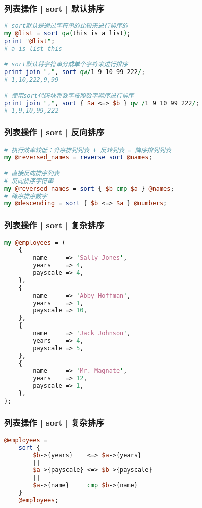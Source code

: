 \begin{frame}[fragile]
  \frametitle{列表操作 | sort | \alert{默认排序}}
\begin{lstlisting}[language=Perl]
# sort默认是通过字符串的比较来进行排序的
my @list = sort qw(this is a list);
print "@list";
# a is list this

# sort默认将字符串分成单个字符来进行排序
print join ",", sort qw/1 9 10 99 222/;
# 1,10,222,9,99

# 使用sort代码块将数字按照数字顺序进行排序
print join ",", sort { $a <=> $b } qw /1 9 10 99 222/;
# 1,9,10,99,222
\end{lstlisting}
\end{frame}

\begin{frame}[fragile]
  \frametitle{列表操作 | sort | \alert{反向排序}}
\begin{lstlisting}[language=Perl]
# 执行效率较低：升序排列列表 + 反转列表 = 降序排列列表
my @reversed_names = reverse sort @names;

# 直接反向排序列表
# 反向排序字符串
my @reversed_names = sort { $b cmp $a } @names;
# 降序排序数字
my @descending = sort { $b <=> $a } @numbers;
\end{lstlisting}
\end{frame}

\begin{frame}[fragile]
  \frametitle{列表操作 | sort | 复杂排序}
\begin{lstlisting}[language=Perl,basicstyle=\scriptsize\tt]
my @employees = (
    {
        name     => 'Sally Jones',
        years    => 4,
        payscale => 4,
    },
    {
        name     => 'Abby Hoffman',
        years    => 1,
        payscale => 10,
    },
    {
        name     => 'Jack Johnson',
        years    => 4,
        payscale => 5,
    },
    {
        name     => 'Mr. Magnate',
        years    => 12,
        payscale => 1,
    },
);
\end{lstlisting}
\end{frame}

\begin{frame}[fragile]
  \frametitle{列表操作 | sort | 复杂排序}
\begin{lstlisting}[language=Perl]
@employees = 
    sort {
        $b->{years}    <=> $a->{years}
        ||
        $a->{payscale} <=> $b->{payscale}
        ||
        $a->{name}     cmp $b->{name}
    }
    @employees;
\end{lstlisting}
\end{frame}


